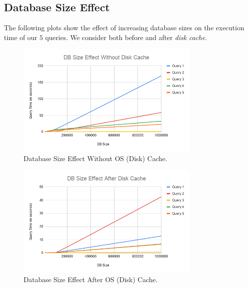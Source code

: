 \subsection{Database Size Effect}
The following plots show the effect of increasing database sizes on the execution time of our $5$ queries. We consider both before and after \emph{disk cache}.

\begin{figure}[H]
    \centering
    \includegraphics[width=0.8\textwidth]{images/stats/db-size-without-cache.png}
    \caption{Database Size Effect Without OS (Disk) Cache.}
    \label{fig:db-size-1}
\end{figure}

\begin{figure}[H]
    \centering
    \includegraphics[width=0.8\textwidth]{images/stats/db-size-after-cache.png}
    \caption{Database Size Effect After OS (Disk) Cache.}
    \label{fig:db-size-2}
\end{figure}

